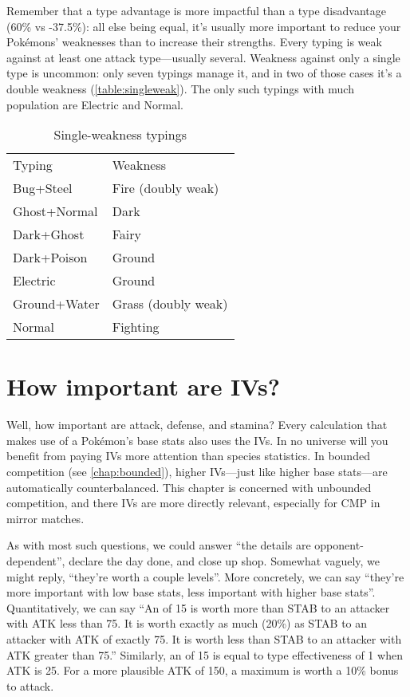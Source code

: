 Remember that a type advantage is more impactful than a type
  disadvantage (60\% vs -37.5\%):
  all else being equal, it's usually more important to reduce your Pokémons'
  weaknesses than to increase their strengths.
Every typing is weak against at least one attack type---usually several.
Weakness against only a single type is uncommon: only seven typings manage it, and in two
 of those cases it's a double weakness (\autoref{table:singleweak}).
The only such typings with much population are Electric and Normal. 
\begin{table}[ht]
\centering
\begin{tabular}{ll}
Typing & Weakness\\
\Midrule
Bug+Steel & Fire (doubly weak) \\
Ghost+Normal & Dark \\
Dark+Ghost & Fairy \\
Dark+Poison & Ground \\
Electric & Ground \\
Ground+Water & Grass (doubly weak) \\
Normal & Fighting \\
\end{tabular}
  \caption{Single-weakness typings\label{table:singleweak}}
\end{table}

\section{How important are IVs?}
Well, how important are attack, defense, and stamina?
Every calculation that makes use of a Pokémon's base stats also uses the IVs.
In no universe will you benefit from paying IVs more attention than species statistics.
In bounded competition (see \autoref{chap:bounded}), higher IVs---just like higher
  base stats---are automatically counterbalanced.
This chapter is concerned with unbounded competition, and there IVs are more directly
  relevant, especially for CMP in mirror matches.

As with most such questions, we could answer ``the details are opponent-dependent'',
  declare the day done, and close up shop.
Somewhat vaguely, we might reply, ``they're worth a couple levels''.
More concretely, we can say ``they're more important with low base stats, less important
  with higher base stats''.
Quantitatively, we can say ``An  of 15 is worth more than STAB to an
  attacker with ATK less than 75. It is worth exactly as much (20\%) as STAB
  to an attacker with ATK of exactly 75. It is worth less than STAB
  to an attacker with ATK greater than 75.''
Similarly, an  of 15 is equal to type effectiveness of 1 when ATK is 25.
For a more plausible ATK of 150, a maximum  is worth a 10\% bonus to attack.


